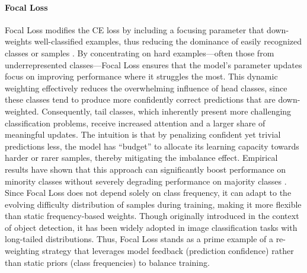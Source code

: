 \paragraph{Focal Loss}
Focal Loss modifies the CE loss by including a focusing parameter that down-weights well-classified examples, thus reducing the dominance of easily recognized classes or samples \cite{lin2018focallossdenseobject}. By concentrating on hard examples—often those from underrepresented classes—Focal Loss ensures that the model’s parameter updates focus on improving performance where it struggles the most. This dynamic weighting effectively reduces the overwhelming influence of head classes, since these classes tend to produce more confidently correct predictions that are down-weighted. Consequently, tail classes, which inherently present more challenging classification problems, receive increased attention and a larger share of meaningful updates. The intuition is that by penalizing confident yet trivial predictions less, the model has “budget” to allocate its learning capacity towards harder or rarer samples, thereby mitigating the imbalance effect. Empirical results have shown that this approach can significantly boost performance on minority classes without severely degrading performance on majority classes \cite{zhang2023deep}. Since Focal Loss does not depend solely on class frequency, it can adapt to the evolving difficulty distribution of samples during training, making it more flexible than static frequency-based weights. Though originally introduced in the context of object detection, it has been widely adopted in image classification tasks with long-tailed distributions. Thus, Focal Loss stands as a prime example of a re-weighting strategy that leverages model feedback (prediction confidence) rather than static priors (class frequencies) to balance training.


